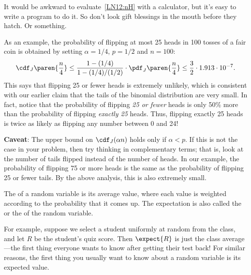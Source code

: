 It would be awkward to evaluate~\eqref{LN12:nH} with a calculator, but it's
easy to write a program to do it.  So don't look gift blessings in the
mouth before they hatch.  Or something.

As an example, the probability of flipping at most 25 heads in 100
tosses of a fair coin is obtained by setting $\alpha = 1/4$, $p = 1/2$
and $n = 100$:
%
\[
\cdf_J\paren{\frac{n}{4}} \leq \frac{1 - (1/4)}{1 - (1/4) / (1/2)}
                             \cdot \pdf_J\paren{\frac{n}{4}}
                    \leq \frac{3}{2} \cdot 1.913 \cdot 10^{-7}.
\]
%
This says that flipping 25 or fewer heads is extremely unlikely, which
is consistent with our earlier claim that the tails of the binomial
distribution are very small.  In fact, notice that the probability of
flipping \textit{25 or fewer} heads is only 50\% more than the
probability of flipping \textit{exactly 25} heads.  Thus, flipping
exactly 25 heads is twice as likely as flipping any number between 0
and 24!  

\noindent \textbf{Caveat}: The upper bound on $\cdf_J(\alpha n)$ holds
only if $\alpha < p$.  If this is not the case in your problem, then
try thinking in complementary terms; that is, look at the number of
tails flipped instead of the number of heads.  In our example,
the probability of flipping 75 or more heads is the same as
the probability of flipping 25 or fewer tails.  By the above
analysis, this is also extremely small.
\fi

\begin{problems}
\classproblems
{}
\end{problems}

\label{expectation_sec} The  of a random
variable is its average value, where each value is weighted according to
the probability that it comes up.  The expectation is also called the
 or the  of the random variable.

For example, suppose we select a student uniformly at random from the
class, and let $R$ be the student's quiz score.  Then  $\expect{R}$ is just the class average ---the first
thing everyone wants to know after getting their test back!  For similar
reasons, the first thing you usually want to know about a random variable
is its expected value.

